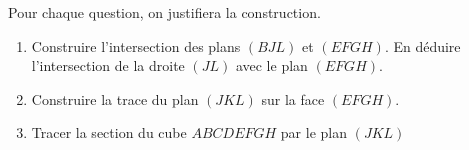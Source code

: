 Pour chaque question, on justifiera la construction.
\begin{enumerate}
     \item
     Construire l'intersection des plans $\left(BJL\right)$ et $\left(EFGH\right)$. En déduire l'intersection de la droite $\left(JL\right)$ avec le plan $\left(EFGH\right)$.
     \item
     Construire la trace du plan $\left(JKL\right)$ sur la face $\left(EFGH\right)$.
     \item
     Tracer la section du cube $ABCDEFGH$ par le plan $\left(JKL\right)$
\end{enumerate}
\begin{corrige}

\end{corrige}
